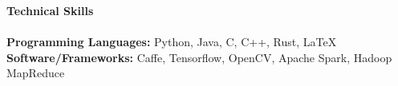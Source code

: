 \documentclass{article}
\begin{document}

\noindent
\textbf{\Large Technical Skills}\\[-2mm]
\HRule\\
\textbf{Programming Languages:} Python, Java, C, C++, Rust, \LaTeX \\
\textbf{Software/Frameworks:} Caffe, Tensorflow, OpenCV, Apache Spark, Hadoop MapReduce

\end{document}
